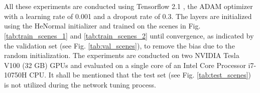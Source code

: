 \\\\
All these experiments are conducted using Tensorflow 2.1 \cite{abadi2016tensorflow}, the ADAM optimizer \cite{kingma2014adam} with a learning rate of 0.001 and a dropout rate of 0.3. The layers are initialized using the HeNormal initializer \cite{he2015delving} and trained on the scenes in Fig. \ref{tab:train_scenes_1} and \ref{tab:train_scenes_2} until convergence, as indicated by the validation set (see Fig. \ref{tab:val_scenes}), to remove the bias due to the random initialization. The experiments are conducted on two NVIDIA Tesla V100 (32 GB) GPUs and evaluated on a single core of an Intel Core Processor i7-10750H CPU. It shall be mentioned that the test set (see Fig. \ref{tab:test_scenes}) is not utilized during the network tuning process.
%

